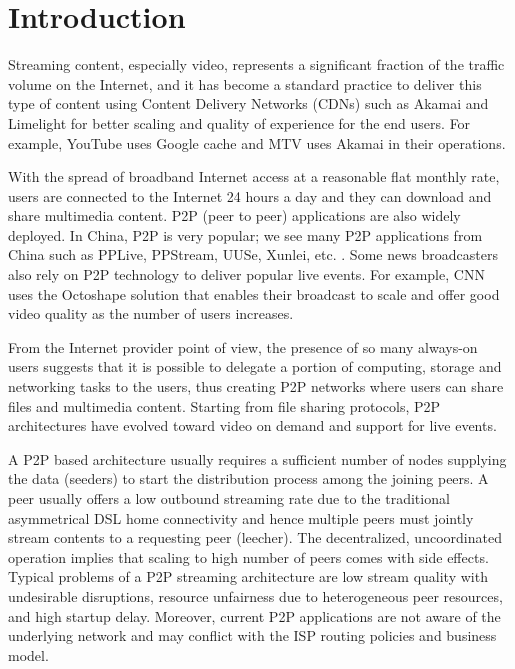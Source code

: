 \documentclass[conference]{IEEEtran}
\begin{document}
\section{Introduction}
Streaming content, especially video, represents a significant fraction of the traffic volume on the Internet, and it has become a standard practice to deliver this type of content using Content Delivery Networks (CDNs) such as Akamai and Limelight for better scaling and quality of experience for the end users. 
For example, YouTube uses Google cache and MTV uses Akamai in their operations.

With the spread of broadband Internet access at a reasonable flat monthly rate, users are connected to the Internet 24 hours a day and they can download and share multimedia content. P2P (peer to peer) applications are also widely deployed. 
In China, P2P is very popular; we see many P2P applications from China such as PPLive, PPStream, UUSe, Xunlei, etc. \cite{Vu:2010:UOC:1865106.1865115}. 
Some news broadcasters also rely on P2P technology to deliver popular live events. 
For example, CNN uses the Octoshape \cite{octoshape} solution that enables their broadcast to scale and offer good video quality as the number of users increases.

From the Internet provider point of view, the presence of so many always-on users suggests that it is possible to delegate a portion of computing, storage and networking tasks to the users, thus creating P2P networks where users can share files and multimedia content. 
Starting from file sharing protocols, P2P architectures have evolved toward video on demand and support for live events.

A P2P based architecture usually requires a sufficient number of nodes supplying the data (seeders) to start the distribution process among the joining peers.  
A peer usually offers a low outbound streaming rate due to the traditional asymmetrical DSL home connectivity and hence multiple peers must jointly stream contents to a requesting peer (leecher).  
The decentralized, uncoordinated operation implies that scaling to high number of peers comes with side effects.  
Typical problems of a P2P streaming architecture are low stream quality with undesirable disruptions, resource unfairness due to heterogeneous peer resources, and high startup delay.  
Moreover, current P2P applications are not aware of the underlying network and may conflict with the ISP routing policies and business model.
\end{document}
